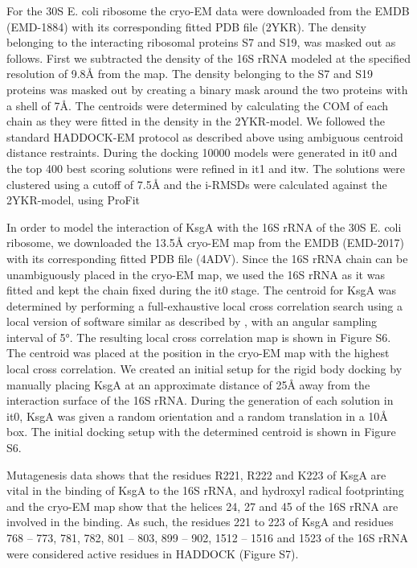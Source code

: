 
For the 30S E. coli ribosome the cryo-EM data were downloaded from the EMDB
(EMD-1884) with its corresponding fitted PDB file (2YKR).  The density
belonging to the interacting ribosomal proteins S7 and S19, was masked out as
follows.  First we subtracted the density of the 16S rRNA modeled at the
specified resolution of 9.8Å from the map.  The density belonging to the S7 and
S19 proteins was masked out by creating a binary mask around the two proteins
with a shell of 7Å.  The centroids were determined by calculating the COM of
each chain as they were fitted in the density in the 2YKR-model.  We followed
the standard HADDOCK-EM protocol as described above using ambiguous centroid
distance restraints.  During the docking 10000 models were generated in it0 and
the top 400 best scoring solutions were refined in it1 and itw.  The solutions
were clustered using a cutoff of 7.5Å and the i-RMSDs were calculated against
the 2YKR-model, using ProFit 


In order to model the interaction of KsgA with the 16S rRNA of the 30S E. coli
ribosome, we downloaded the 13.5Å cryo-EM map from the EMDB (EMD-2017) with its
corresponding fitted PDB file (4ADV).  Since the 16S rRNA chain can be
unambiguously placed in the cryo-EM map, we used the 16S rRNA as it was fitted
and kept the chain fixed during the it0 stage.  The centroid for KsgA was
determined by performing a full-exhaustive local cross correlation search using
a local version of software similar as described by
\citeauthor{Hoang2013}, with an angular sampling interval of 5°.  The
resulting local cross correlation map is shown in Figure S6.  The centroid was
placed at the position in the cryo-EM map with the highest local cross
correlation.  We created an initial setup for the rigid body docking by
manually placing KsgA at an approximate distance of 25Å away from the
interaction surface of the 16S rRNA.  During the generation of each solution in
it0, KsgA was given a random orientation and a random translation in a 10Å box.
The initial docking setup with the determined centroid is shown in Figure S6.

Mutagenesis data shows that the residues R221, R222 and K223 of KsgA are vital
in the binding of KsgA to the 16S rRNA, and hydroxyl radical footprinting and
the cryo-EM map show that the helices 24, 27 and 45 of the 16S rRNA are
involved in the binding.  As such, the residues 221 to 223 of KsgA and residues
768 – 773, 781, 782, 801 – 803, 899 – 902, 1512 – 1516 and 1523 of the 16S rRNA
were considered active residues in HADDOCK (Figure S7). 

